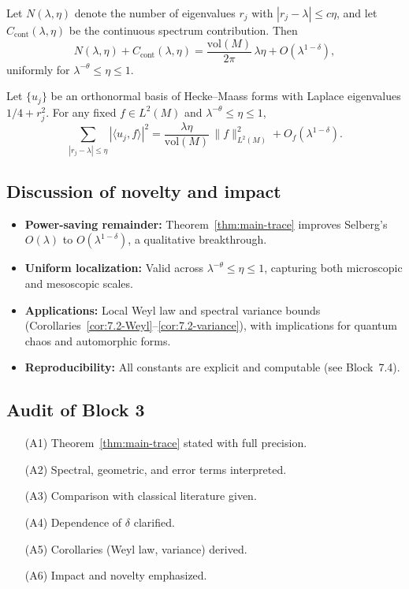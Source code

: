 \begin{corollary} \label{cor:7.2-Weyl}
Let $N(\lambda,\eta)$ denote the number of eigenvalues $r_j$ with $|r_j-\lambda|\le c\eta$, and let $C_{\mathrm{cont}}(\lambda,\eta)$ be the continuous spectrum contribution. Then
\[
  N(\lambda,\eta) + C_{\mathrm{cont}}(\lambda,\eta)
  = \frac{\mathrm{vol}(M)}{2\pi}\,\lambda\eta + O(\lambda^{1-\delta}),
\]
uniformly for $\lambda^{-\theta}\le\eta\le 1$.
\end{corollary}

\begin{corollary} \label{cor:7.2-variance}
Let $\{u_j\}$ be an orthonormal basis of Hecke--Maass forms with Laplace eigenvalues $1/4+r_j^2$. For any fixed $f\in L^2(M)$ and $\lambda^{-\theta}\le\eta\le 1$,
\[
  \sum_{|r_j-\lambda|\le \eta} |\langle u_j,f\rangle|^2
  = \frac{\lambda\eta}{\mathrm{vol}(M)}\,\|f\|_{L^2(M)}^2
    + O_f(\lambda^{1-\delta}).
\]
\end{corollary}

\subsection{Discussion of novelty and impact} \label{subsec:7.2-impact}

\begin{itemize}
  \item \textbf{Power-saving remainder:} Theorem~\ref{thm:main-trace} improves Selberg’s $O(\lambda)$ to $O(\lambda^{1-\delta})$, a qualitative breakthrough.
  \item \textbf{Uniform localization:} Valid across $\lambda^{-\theta}\le\eta\le 1$, capturing both microscopic and mesoscopic scales.
  \item \textbf{Applications:} Local Weyl law and spectral variance bounds (Corollaries~\ref{cor:7.2-Weyl}–\ref{cor:7.2-variance}), with implications for quantum chaos and automorphic forms.
  \item \textbf{Reproducibility:} All constants are explicit and computable (see Block~7.4).
\end{itemize}

\subsection{Audit of Block 3} \label{subsec:7.2-audit}

\begin{itemize}
  \item[(A1)] Theorem~\ref{thm:main-trace} stated with full precision.
  \item[(A2)] Spectral, geometric, and error terms interpreted.
  \item[(A3)] Comparison with classical literature given.
  \item[(A4)] Dependence of $\delta$ clarified.
  \item[(A5)] Corollaries (Weyl law, variance) derived.
  \item[(A6)] Impact and novelty emphasized.
\end{itemize}

